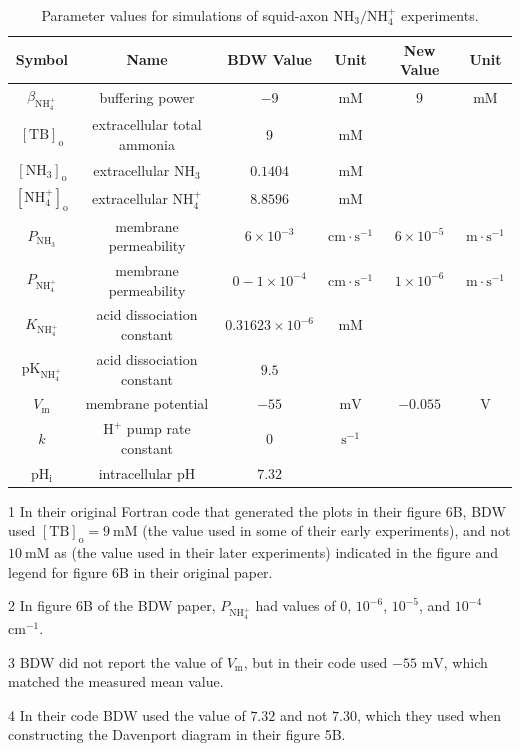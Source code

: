 \documentclass[fleqn,10pt]{physiome}
\begin{document}
\begin{table}[hbt!]
\caption{Parameter values for simulations of squid-axon $\mathrm{NH_3}/\mathrm{NH_4^+}$ experiments.}\label{table3}
\begin{threeparttable}
\def\arraystretch{1.5}
\begin{tabular}{c|c|c|c|c|c}
\toprule
Symbol & Name & BDW Value & Unit & New Value & Unit \\ 
\midrule
$\beta_\mathrm{NH_4^+}$ & buffering power & $-9$ & $\mathrm{mM}$ & $9$ & $\mathrm{mM}$ \\ 
${\mathrm{[TB]_o}}$ & extracellular total ammonia & $9$ \tnote{1} & $\mathrm{mM}$ & & \\ 
${\mathrm{[NH_3]_o}}$ & extracellular $\mathrm{NH_3}$ & $0.1404$ & $\mathrm{mM}$ & & \\ 
${\mathrm{[NH_4^+]_o}}$ & extracellular $\mathrm{NH_4^+}$ & $8.8596$ & $\mathrm{mM}$ & & \\ 
$P_{\mathrm{NH_3}}$ & membrane permeability & $6\times 10^{-3}$ & $\mathrm{cm\cdot s^{-1}}$ & $6\times 10^{-5}$ & $\mathrm{m\cdot s^{-1}}$ \\ 
$P_{\mathrm{NH_4^+}}$ & membrane permeability & $0-1\times 10^{-4}$ \tnote{2} & $\mathrm{cm\cdot s^{-1}}$ & $1\times 10^{-6}$ & $\mathrm{m\cdot s^{-1}}$ \\
$K_\mathrm{NH_4^+}$ & acid dissociation constant & $0.31623\times10^{-6}$ & $\mathrm{mM}$ & & \\
$\mathrm{pK_{NH_4^+}}$ & acid dissociation constant & $9.5$ & & & \\
$V_\mathrm{m}$ & membrane potential & $-55$ \tnote{3} & $\mathrm{mV}$ & $-0.055$ & $\mathrm{V}$ \\ 
$k$ & $\mathrm{H^+}$ pump rate constant & $0$ & $\mathrm{s^{-1}}$ & & \\
$\mathrm{pH_i}$ & intracellular $\mathrm{pH}$ & $7.32$ \tnote{4} & & & \\
\bottomrule
\end{tabular}
\begin{tablenotes}
\item[1] In their original Fortran code that generated the plots in their figure 6B, BDW used $\mathrm{[TB]_o}=9~\mathrm{mM}$ (the value used in some of their early experiments), and not $10~\mathrm{mM}$ as (the value used in their later experiments) indicated in the figure and legend for figure 6B in their original paper.
\item[2] In figure 6B of the BDW paper, $P_\mathrm{NH_4^+}$ had values of $0$, $10^{-6}$, $10^{-5}$, and $10^{-4}$ $\mathrm{cm}^{-1}$.
\item[3] BDW did not report the value of $V_\mathrm{m}$, but in their code used $-55$ $\mathrm{mV}$, which matched the measured mean value.
\item[4] In their code BDW used the value of $7.32$ and not $7.30$, which they used when constructing the Davenport diagram in their figure 5B.
\end{tablenotes}
\end{threeparttable}
\end{table}
\end{document}
